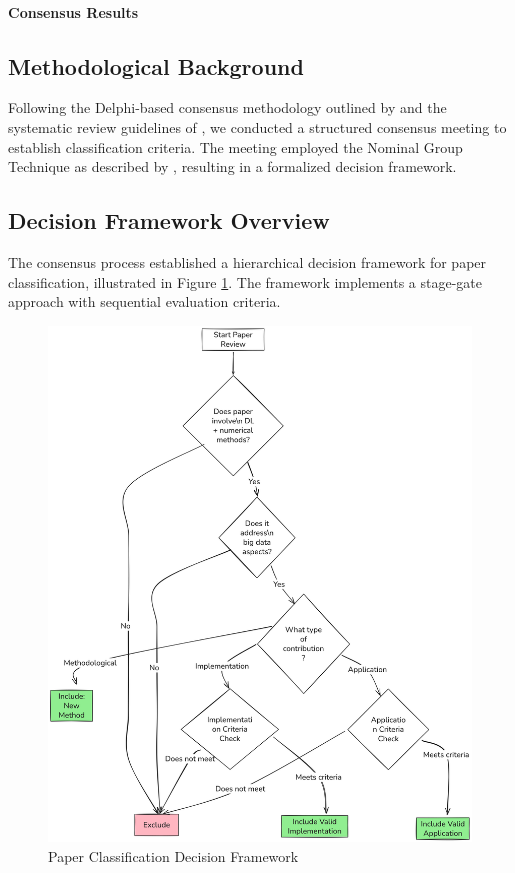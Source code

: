 \documentclass[a4paper,12pt]{article}
\begin{document}
\begin{enumerate}
    \paragraph{Consensus Results}

\subsection{Methodological Background}
Following the Delphi-based consensus methodology outlined by \cite{dalkey1963experimental} and the systematic review guidelines of \cite{kitchenham2004procedures}, we conducted a structured consensus meeting to establish classification criteria. The meeting employed the Nominal Group Technique as described by \cite{delbecq1971group}, resulting in a formalized decision framework.

\subsection{Decision Framework Overview}
The consensus process established a hierarchical decision framework for paper classification, illustrated in Figure \ref{fig:decision-flow}. The framework implements a stage-gate approach with sequential evaluation criteria.

\begin{figure}
\centering
\includegraphics[width=15cm] {media/Company Structure.png}
\caption{Paper Classification Decision Framework}
\label{fig:decision-flow}
\end{figure}


\end{enumerate}
\end{document}
